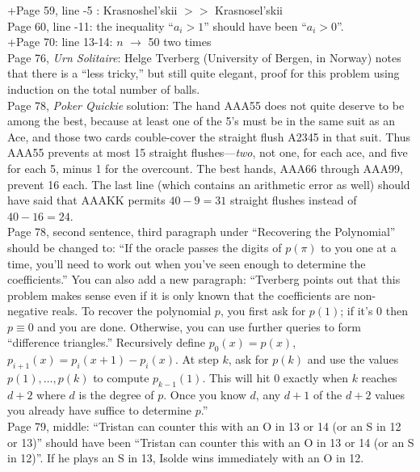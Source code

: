 \documentclass[11pt]{article}
\begin{document}
+Page 59, line -5 :  Krasnoshel'skii $>>$ Krasnosel'skii \\

Page 60, line -11: the inequality ``$a_i>1$'' should have been ``$a_i>0$''.\\

+Page 70: line 13-14: $n$ $\to$ 50 two times\\ 

Page 76, {\em Urn Solitaire}: Helge Tverberg (University of Bergen, in Norway) notes
that there is a ``less tricky,'' but still quite elegant, proof for this problem using
induction on the total number of balls.\\

Page 78, {\em Poker Quickie} solution:  The hand AAA55 does not quite deserve to be among
the best, because at least one of the 5's must be in the same suit as an Ace, and those two cards
couble-cover the straight flush A2345 in that suit.  Thus AAA55 prevents at most 15 straight
flushes---{\em two}, not one, for each ace, and five for each 5, minus 1 for the overcount.
The best hands, AAA66 through AAA99, prevent 16 each.  The last line (which contains an arithmetic
error as well) should have said that AAAKK permits $40 - 9 = 31$ straight flushes instead of $40 - 16 = 24$. \\

Page 78, second sentence, third paragraph under ``Recovering the Polynomial'' should be changed to:
``If the oracle passes the digits of $p(\pi)$ to you one at a time, you'll need to work out when
you've seen enough to determine the coefficients.''  You can also add a new paragraph:
``Tverberg points out that this
problem makes sense even if it is only known that the coefficients are non-negative
reals.  To recover the polynomial $p$, you first ask for $p(1)$; if it's 0 then
$p \equiv 0$ and you are done.  Otherwise, you can use further queries to
form ``difference triangles.''  Recursively define $p_0(x) = p(x)$, $p_{i+1}(x) =
p_i(x{+}1)-p_i(x)$.  At step $k$, ask for $p(k)$ and use the values $p(1),\dots,p(k)$
to compute $p_{k-1}(1)$.  This will hit 0 exactly when $k$ reaches $d{+}2$ where $d$ is the degree
of $p$. Once you know $d$, any $d{+}1$ of the $d{+}2$ values you already have suffice to
determine $p$.''\\

Page 79, middle:  ``Tristan can counter this with an O in 13 or 14 (or an S in 12 or 13)'' should
have been ``Tristan can counter this with an O in 13 or 14 (or an S in 12)''.  If he plays an S in 13,
Isolde wins immediately with an O in 12.\\
\end{document}
